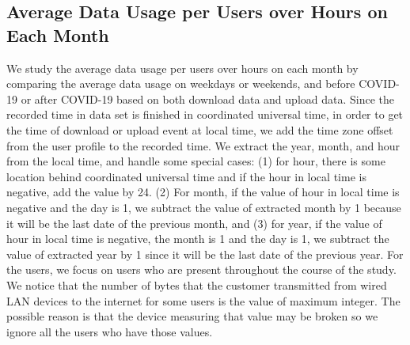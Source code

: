\documentclass[conference,10pt]{IEEEtran}
\begin{document}
\subsection{Average Data Usage per Users over Hours on Each Month}
We study the average data usage per users over hours on each month by comparing the average data usage on weekdays or weekends, and before COVID-19 or after COVID-19 based on both download data and upload data. Since the recorded time in data set is finished in coordinated universal time, in order to get the time of download or upload event at local time, we add the time zone offset from the user profile to the recorded time.  We extract the year, month, and hour from the local time, and handle some special cases: (1) for hour, there is some location behind coordinated universal time and if the hour in local time is negative, add the value by 24. (2) For month, if the value of hour in local time is negative and the day is 1, we subtract the value of extracted month by 1 because it will be the last date of the previous month, and (3) for year, if the value of hour in local time is negative, the month is 1 and the day is 1, we subtract the value of extracted year by 1 since it will be the last date of the previous year. For the users, we focus on users who are present throughout the course of the study. We notice that the number of bytes that the customer transmitted from wired LAN devices to the internet for some users is the value of maximum integer. The possible reason is that the device measuring that value may be broken so we ignore all the users who have those values. 
\end{document}
